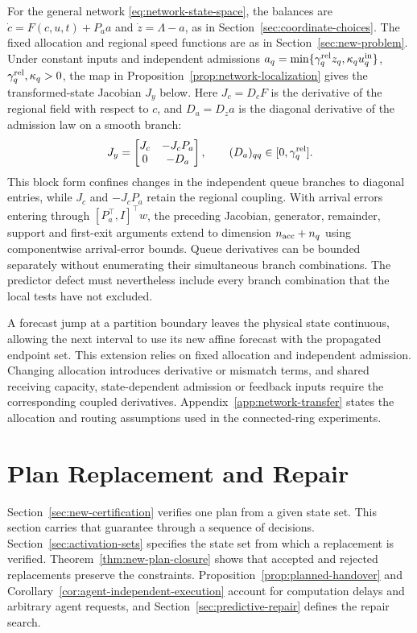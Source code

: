\documentclass[final]{cas-sc}
\theoremstyle{definition}
\theoremstyle{plain}
\theoremstyle{definition}
\theoremstyle{plain}
\newcommand{\appref}[1]{Appendix~\ref{#1}}
\begin{document}
For the general network \eqref{eq:network-state-space}, the balances
are $\dot c=F(c,u,t)+P_aa$ and $\dot z=\Lambda-a$, as in
Section~\ref{sec:coordinate-choices}. The fixed allocation and regional speed
functions are as in Section~\ref{sec:new-problem}. Under constant inputs
and independent admissions
$a_q=\min\{\gamma_q^{\rm rel}z_q,\kappa_qu_q^{\rm in}\}$,
$\gamma_q^{\rm rel},\kappa_q>0$, the map in
Proposition~\ref{prop:network-localization} gives the transformed-state Jacobian
$J_y$ below. Here $J_c=D_cF$ is the derivative of the regional field
with respect to $c$, and $D_a=D_za$ is the diagonal derivative of the
admission law on a smooth branch:
\begin{equation}
J_y=\begin{bmatrix}J_c&-J_cP_a\\0&-D_a\end{bmatrix},\qquad
(D_a)_{qq}\in[0,\gamma_q^{\rm rel}].
\label{eq:network-jacobian}
\end{equation}
This block form confines changes in the independent queue branches to
diagonal entries, while $J_c$ and $-J_cP_a$ retain the regional
coupling. With arrival errors entering through
$[P_a^\top,I]^\top w$, the preceding Jacobian, generator, remainder,
support and first-exit arguments extend to dimension
$n_{\rm acc}+n_q$ using componentwise arrival-error bounds. Queue
derivatives can be bounded separately without enumerating their
simultaneous branch combinations. The predictor defect must
nevertheless include every branch combination that the local tests
have not excluded.

A forecast jump at a partition boundary leaves the physical state
continuous, allowing the next interval to use its new affine forecast
with the propagated endpoint set. This extension relies on fixed
allocation and independent admission. Changing allocation introduces
derivative or mismatch terms, and shared receiving capacity,
state-dependent admission or feedback inputs require the corresponding
coupled derivatives. \appref{app:network-transfer} states the allocation and
routing assumptions used in the connected-ring experiments.

\section{Plan Replacement and Repair}
\label{sec:replacement-repair}

Section~\ref{sec:new-certification} verifies one plan from a given state
set. This section carries that guarantee through a sequence of
decisions. Section~\ref{sec:activation-sets} specifies the state set
from which a replacement is verified. Theorem~\ref{thm:new-plan-closure}
shows that accepted and rejected replacements preserve the
constraints. Proposition~\ref{prop:planned-handover} and
Corollary~\ref{cor:agent-independent-execution} account for computation delays and
arbitrary agent requests, and Section~\ref{sec:predictive-repair} defines the
repair search.
\end{document}
